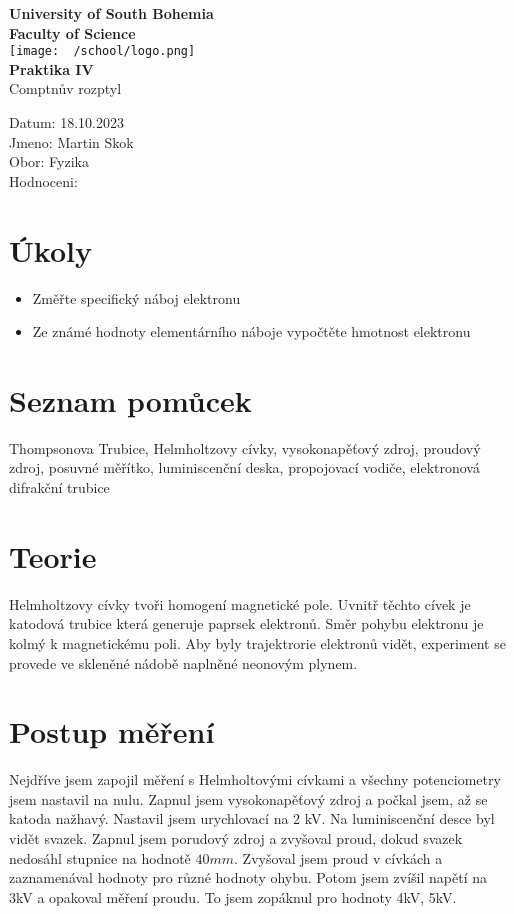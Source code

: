 \documentclass{article}
\begin{document}
\begin{center}
\textbf{\Huge{University of South Bohemia}}\\
\vspace{50px}
\textbf{\Large{Faculty of Science}} \\
\vspace{30px}
\texttt{[image: ~/school/logo.png]} \\
\vspace{30px}
\textbf{\large{Praktika IV}}
\vspace{20px}
\\
\vspace{20px}
\large{Comptnův rozptyl} \\
\vspace{60px}
\end{center}
\begin{flushleft}
Datum: 18.10.2023 \\
Jmeno: Martin Skok \\
Obor: Fyzika \\
Hodnoceni:
\end{flushleft}
\newpage
\section{Úkoly}
\begin{itemize}
  \item Změřte specifický náboj elektronu
  \item Ze známé hodnoty elementárního náboje vypočtěte hmotnost elektronu
\end{itemize}
\section{Seznam pomůcek}
Thompsonova Trubice,
Helmholtzovy cívky,
vysokonapěťový zdroj,
proudový zdroj,
posuvné měřítko,
luminiscenční deska,
propojovací vodiče,
elektronová difrakční trubice
\section{Teorie}
Helmholtzovy cívky tvoři homogení magnetické pole.
Uvnitř těchto cívek je katodová trubice která generuje paprsek elektronů.
Směr pohybu elektronu je kolmý k magnetickému poli.
Aby byly trajektrorie elektronů vidět, experiment se provede
ve skleněné nádobě naplněné neonovým plynem.



\section{Postup měření}
Nejdříve jsem zapojil měření s Helmholtovými cívkami a všechny potenciometry jsem nastavil na nulu.
Zapnul jsem vysokonapěťový zdroj a počkal jsem, až se katoda nažhavý.
Nastavil jsem urychlovací na 2 kV. Na luminiscenční desce byl vidět svazek.
Zapnul jsem porudový zdroj a zvyšoval proud, dokud svazek nedosáhl stupnice na hodnotě $40 mm$.
Zvyšoval jsem proud v cívkách a zaznamenával hodnoty pro různé hodnoty ohybu.
Potom jsem zvíšil napětí na 3kV a opakoval měření proudu.
To jsem zopáknul pro hodnoty 4kV, 5kV.
\end{document}
